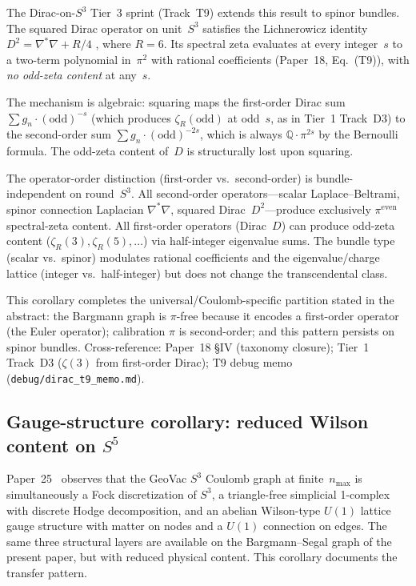 \documentclass[twocolumn,pra,amsmath,amssymb,superscriptaddress]{revtex4-2}
\begin{document}
The Dirac-on-$S^3$ Tier~3 sprint (Track~T9) extends this result to
spinor bundles.  The squared Dirac operator on unit~$S^3$ satisfies
the Lichnerowicz identity $D^2 = \nabla^*\nabla + R/4$
\cite{lichnerowicz1963}, where $R = 6$.  Its spectral zeta evaluates
at every integer~$s$ to a two-term polynomial in~$\pi^2$ with
rational coefficients (Paper~18, Eq.~(T9)), with
\emph{no odd-zeta content} at any~$s$.

The mechanism is algebraic: squaring maps the first-order Dirac
sum $\sum g_n \cdot (\text{odd})^{-s}$ (which produces
$\zeta_R(\text{odd})$ at odd~$s$, as in Tier~1 Track~D3) to the
second-order sum $\sum g_n \cdot (\text{odd})^{-2s}$, which is always
$\mathbb{Q} \cdot \pi^{2s}$ by the Bernoulli formula.  The
odd-zeta content of~$D$ is structurally lost upon squaring.

\begin{corollary}
The operator-order distinction (first-order vs.\ second-order) is
bundle-independent on round~$S^3$.  All second-order operators---scalar
Laplace--Beltrami, spinor connection Laplacian $\nabla^*\nabla$,
squared Dirac~$D^2$---produce exclusively $\pi^{\mathrm{even}}$
spectral-zeta content.  All first-order operators (Dirac~$D$) can
produce odd-zeta content ($\zeta_R(3), \zeta_R(5), \ldots$) via
half-integer eigenvalue sums.  The bundle type (scalar vs.\ spinor)
modulates rational coefficients and the eigenvalue/charge lattice
(integer vs.\ half-integer) but does not change the transcendental
class.
\end{corollary}

This corollary completes the universal/Coulomb-specific partition
stated in the abstract: the Bargmann graph is $\pi$-free because
it encodes a first-order operator (the Euler operator); calibration
$\pi$ is second-order; and this pattern persists on spinor bundles.
Cross-reference: Paper~18 \S IV (taxonomy closure);
Tier~1 Track~D3 ($\zeta(3)$ from first-order Dirac); T9 debug memo
(\texttt{debug/dirac\_t9\_memo.md}).

\subsection{Gauge-structure corollary: reduced Wilson content on $S^5$}
\label{sec:gauge-structure-reduced}

Paper~25~\cite{paper25} observes that the GeoVac $S^3$ Coulomb graph
at finite~$n_{\max}$ is simultaneously a Fock discretization of
$S^3$, a triangle-free simplicial 1-complex with discrete Hodge
decomposition, and an abelian Wilson-type $U(1)$ lattice gauge
structure with matter on nodes and a $U(1)$ connection on edges.
The same three structural layers are available on the
Bargmann--Segal graph of the present paper, but with reduced
physical content.  This corollary documents the transfer pattern.
\end{document}
